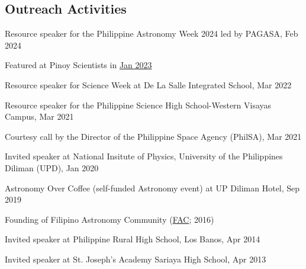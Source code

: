 \documentclass[12pt,letterpaper]{article}
\begin{document}
\subsection{Outreach Activities}
\begin{list}{}{\cvlist}
    \item Resource speaker for the Philippine Astronomy Week 2024 led by PAGASA, Feb 2024
    \item Featured at Pinoy Scientists in \href{https://www.facebook.com/pinoyscientists/posts/pfbid0Lj83pJZaaU35tdSpz5UKgkAodhBqMzudUjCS7z4UV32zqiqmkQzT7LdtpGTsu7Cql}{Jan 2023}
    \item Resource speaker for Science Week at De La Salle Integrated School, Mar 2022
    \item Resource speaker for the Philippine Science High School-Western Visayas Campus, Mar 2021
    \item Courtesy call by the Director of the Philippine Space Agency (PhilSA), Mar 2021
    \item Invited speaker at National Insitute of Physics, University of the Philippines Diliman (UPD), Jan 2020
    \item Astronomy Over Coffee (self-funded Astronomy event) at UP Diliman Hotel, Sep 2019
    \item Founding of Filipino Astronomy Community (\href{https://www.facebook.com/groups/filastrocomm}{FAC}; 2016)
    \item Invited speaker at Philippine Rural High School, Los Banos, Apr 2014
    \item Invited speaker at St. Joseph's Academy Sariaya High School, Apr 2013
\end{list}


\end{document}
